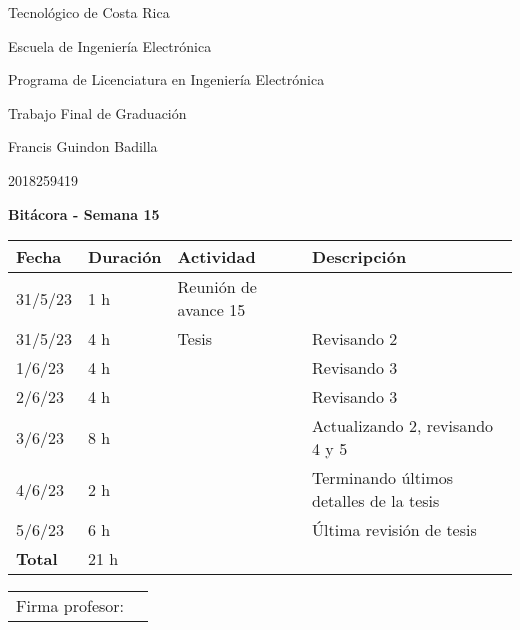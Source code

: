 \documentclass[12pt,oneside]{book}
\begin{document}
 \graphicspath{{./}{../tesis/fig/}}
  Tecnológico de Costa Rica
  \par\vspace{1mm}
  Escuela de Ingeniería Electrónica
  \par\vspace{1mm}
  Programa de Licenciatura en Ingeniería Electrónica
  \par\vspace{10mm}
  Trabajo Final de Graduación
  \par\vspace{1mm}
  Francis Guindon Badilla
  \par\vspace{1mm}
  2018259419
  \par\vspace{10mm}
  \large\textbf{Bitácora - Semana 15}
  \par\vspace{10mm}
  \small

  \begin{table} [!h]
    \centering
    \small
    \begin{tabular}{p{1.5 cm} p{2.1 cm} p{5 cm} p{8 cm}}
      \hline
      Fecha & Duración & Actividad & Descripción \\
      \hline
      31/5/23 & 1 h & Reunión de avance 15 & \\
      31/5/23 & 4 h & Tesis & Revisando 2 \\
      1/6/23 & 4 h & & Revisando 3 \\
      2/6/23 & 4 h & & Revisando 3 \\
      3/6/23 & 8 h & & Actualizando 2, revisando 4 y 5 \\
      4/6/23 & 2 h & & Terminando últimos detalles de la tesis \\
      5/6/23 & 6 h & & Última revisión de tesis \\
      \hline
      \textbf{Total} & 21 h \\
      \hline
    \end{tabular}
  \end{table}
  
  \vfill

  \begin{tabular}{p{3 cm} p{10 cm}}
    Firma profesor: & \\
    \cline{2-2}
  \end{tabular}

  \newpage
\end{document}
